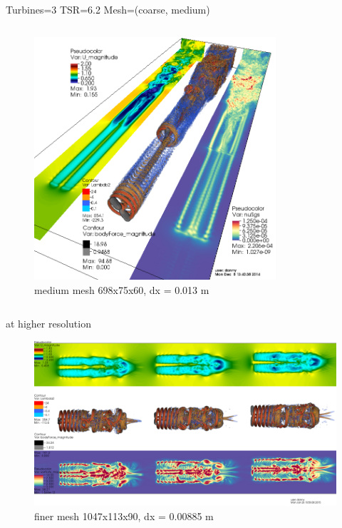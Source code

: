 \documentclass[xcolor=x11names,compress]{beamer}
\begin{document}
\begin{frame}{Turbines=3  TSR=6.2  Mesh=(coarse, medium)}
\begin{columns}
		    \begin{column}{0.6\textwidth}
		        \begin{figure}[p]
				    \centering
				    \includegraphics[width=0.8\textwidth]{figures/fastFlume__Turbines=3_TSR=6p2_Layout=offset_Mesh=medium.png}
				    \caption{\scriptsize{medium mesh 698x75x60, dx = 0.013 m}}
				\end{figure}

		    \end{column}

		\end{columns}

	\end{frame}


	\begin{frame}{at higher resolution}

		\begin{figure}[p]
		    \centering
    		\includegraphics[width=1.05\textwidth]{figures/fastFlume__Turbines=3_TSR=6p2_Layout=offset_Mesh=fine.png}
		    \caption{\scriptsize{finer mesh 1047x113x90, dx = 0.00885 m}}
		\end{figure}

	\end{frame}
\end{document}
